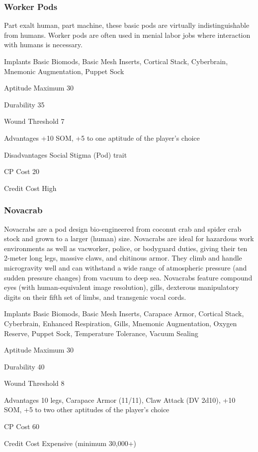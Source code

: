 \subsubsection{Worker Pods} \label{sec:starting-worker-pods} 

Part exalt human, part machine, these basic pods are virtually indistinguishable from humans. Worker pods are often used in menial labor jobs where interaction with humans is necessary. 

\begin{description*} \item[Implants] Basic Biomods, Basic Mesh Inserts, Cortical Stack, Cyberbrain, Mnemonic Augmentation, Puppet Sock \item[Aptitude Maximum] 30 \item[Durability] 35 \item[Wound Threshold] 7 \item[Advantages] +10 SOM, +5 to one aptitude of the player’s choice \item[Disadvantages] Social Stigma (Pod) trait \item[CP Cost] 20 \item[Credit Cost] High \end{description*} 

\subsubsection{Novacrab} \label{sec:starting-novacrab} 

Novacrabs are a pod design bio-engineered from coconut crab and spider crab stock and grown to a larger (human) size. Novacrabs are ideal for hazardous work environments as well as vacworker, police, or bodyguard duties, giving their ten 2-meter long legs, massive claws, and chitinous armor. They climb and handle microgravity well and can withstand a wide range of atmospheric pressure (and sudden pressure changes) from vacuum to deep sea. Novacrabs feature compound eyes (with human-equivalent image resolution), gills, dexterous manipulatory digits on their fifth set of limbs, and transgenic vocal cords. 

\begin{description*} \item[Implants] Basic Biomods, Basic Mesh Inserts, Carapace Armor, Cortical Stack, Cyberbrain, Enhanced Respiration, Gills, Mnemonic Augmentation, Oxygen Reserve, Puppet Sock, Temperature Tolerance, Vacuum Sealing \item[Aptitude Maximum] 30 \item[Durability] 40 \item[Wound Threshold] 8 \item[Advantages] 10 legs, Carapace Armor (11/11), Claw Attack (DV 2d10), +10 SOM, +5 to two other aptitudes of the player’s choice \item[CP Cost] 60 \item[Credit Cost] Expensive (minimum 30,000+) \end{description*} 


